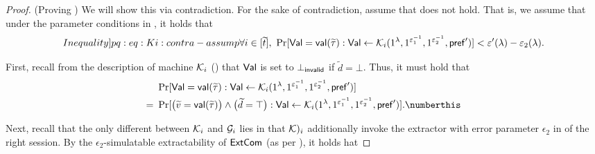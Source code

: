 \begin{proof}(Proving )
We will show this via contradiction. For the sake of contradiction, assume that  does not hold. That is, we assume that under the parameter conditions in , it holds that 
\begin{equation}\label[Inequality]{pq:eq:Ki:contra-assump}
    \forall i \in [\tilde{t}],\ \Pr[\Val = \msf{val}(\tilde{\tau}) :\Val \gets \mcal{K}_i{(1^\secpar, 1^{\epsilon_1^{-1}}, 1^{\epsilon_2^{-1}}, \msf{pref}')}] < {\epsilon'(\secpar) - \epsilon_2(\secpar)}.
\end{equation} 

First, recall from the description of machine $\mathcal{K}_i$ () that $\mathsf{Val}$ is set to $\bot_{\mathsf{invalid}}$ if $\tilde{d} = \bot$. Thus, it must hold that
\begin{align*}
& \Pr[\Val = \msf{val}(\tilde{\tau}) :\Val \gets \mcal{K}_i{(1^\secpar, 1^{\epsilon_1^{-1}}, 1^{\epsilon_2^{-1}}, \msf{pref}')}] \\ 
=~& 
\Pr[\big(\tilde{v} = \msf{val}(\tilde{\tau})\big) \wedge \big( \tilde{d} = \top \big):\Val \gets \mcal{K}_i{(1^\secpar, 1^{\epsilon_1^{-1}}, 1^{\epsilon_2^{-1}}, \msf{pref}')}]. \numberthis \label{pq:lem:bound:Gi:proof:diff:Ki:Ki:middle}
\end{align*} 

Next, recall that the only different between $\mathcal{K}_i$ and $\mathcal{G}_i$ lies in that $\mathcal{K})_i$ additionally invoke the extractor with error parameter $\epsilon_2$ in  of the right session. By the $\epsilon_2$-simulatable extractability of $\mathsf{ExtCom}$ (as per ), it holds hat




\end{proof}
